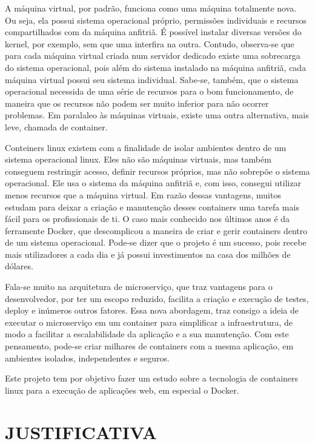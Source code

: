 \documentclass[
	12pt,				%
	openright,			%
	oneside,			%
	a4paper,			%
	chapter=TITLE,		%
	section=TITLE,		%
	english,			%
	french,				%
	spanish,			%
	brazil				%
	]{abntex2}
\begin{document}
A máquina virtual, por padrão, funciona como uma máquina totalmente nova. Ou seja, ela possui sistema operacional próprio, permissões individuais e recursos compartilhados com da máquina anfitriã. É possível instalar diversas versões do kernel, por exemplo, sem que uma interfira na outra. Contudo, observa-se que para cada máquina virtual criada num servidor dedicado existe uma sobrecarga do sistema operacional, pois além do sistema instalado na máquina anfitriã, cada máquina virtual possui seu sistema individual. Sabe-se, também, que o sistema operacional necessida de uma série de recursos para o bom funcionamento, de maneira que os recursos não podem ser muito inferior para não ocorrer problemas. Em paralaleo às máquinas virtuais, existe uma outra alternativa, mais leve, chamada de container.

Conteiners linux existem com a finalidade de isolar ambientes dentro de um sistema operacional linux. Eles não são máquinas virtuais, mas também conseguem restringir acesso, definir recursos próprios, mas não sobrepõe o sistema operacional. Ele usa o sistema da máquina anfitriã e, com isso, consegui utilizar menos recursos que a máquina virtual. Em razão dessas vantagens, muitos estudam para deixar a criação e manutenção desses containers uma tarefa mais fácil para os profissionais de ti. O caso mais conhecido nos últimos anos é da ferramente Docker, que descomplicou a maneira de criar e gerir containers dentro de um sistema operacional. Pode-se dizer que o projeto é um sucesso, pois recebe mais utilizadores a cada dia e já possui investimentos na casa dos milhões de dólares.

Fala-se muito na arquitetura de microserviço, que traz vantagens para o desenvolvedor, por ter um escopo reduzido, facilita a criação e execução de testes, deploy e inúmeros outros fatores. Essa nova abordagem, traz consigo a ideia de executar o microserviço em um container para simplificar a infraestrutura, de modo a facilitar a escalabilidade da aplicação e a sua manutenção. Com este pensamento, pode-se criar milhares de containers com a mesma aplicação, em ambientes isolados, independentes e seguros.

Este projeto tem por objetivo fazer um estudo sobre a tecnologia de containers linux para a execução de aplicações web, em especial o Docker.


\section{JUSTIFICATIVA}
\end{document}
